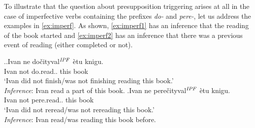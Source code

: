 
To illustrate that the question about presupposition triggering arises at all in the case of imperfective verbs containing the prefixes \textit{do-} and \textit{pere-}, let us address the examples in \ref{ex:imperf}. As shown,  \ref{ex:imperf1} has an inference that the reading of the book started and \ref{ex:imperf2} has an inference that there was a previous event of reading (either completed or not).

\ex.\label{ex:imperf}\ag.\label{ex:imperf1}Ivan ne do\v{c}ityval$^{\mathit{IPF}}$ \`{e}tu knigu.\\
Ivan not do.read.. this book\\
\vspace{0.5em}
`Ivan did not finish/was not finishing reading this book.'\\
\textit{Inference}: Ivan read a part of this book.
\bg.\label{ex:imperf2}Ivan ne pere\v{c}ityval$^{\mathit{IPF}}$ \`{e}tu knigu.\\
Ivan not pere.read.. this book\\
\vspace{0.5em}
`Ivan did not reread/was not rereading this book.'\\
\textit{Inference}: Ivan read/was reading this book before.

